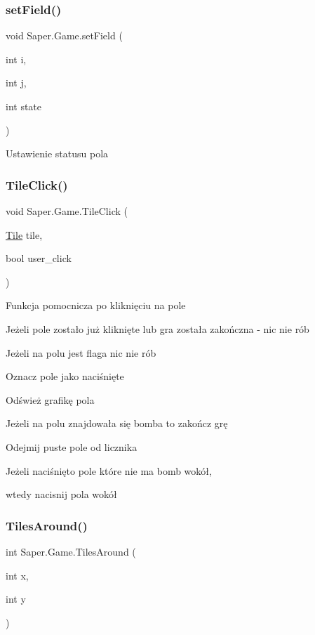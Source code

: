 \subsubsection{\texorpdfstring{setField()}{setField()}}
{\footnotesize\ttfamily void Saper.\+Game.\+set\+Field (\begin{DoxyParamCaption}\item[{int}]{i,  }\item[{int}]{j,  }\item[{int}]{state }\end{DoxyParamCaption})}

Ustawienie statusu pola \mbox{\label{class_saper_1_1_game_ad7088e52259cb63a068213bf2856eebb}} 
\subsubsection{\texorpdfstring{TileClick()}{TileClick()}}
{\footnotesize\ttfamily void Saper.\+Game.\+Tile\+Click (\begin{DoxyParamCaption}\item[{\mbox{\hyperlink{class_saper_1_1_tile}{Tile}}}]{tile,  }\item[{bool}]{user\+\_\+click }\end{DoxyParamCaption})}

Funkcja pomocnicza po kliknięciu na pole

Jeżeli pole zostało już kliknięte lub gra została zakończna -\/ nic nie rób

Jeżeli na polu jest flaga nic nie rób

Oznacz pole jako naciśnięte

Odśwież grafikę pola

Jeżeli na polu znajdowała się bomba to zakończ grę

Odejmij puste pole od licznika

Jeżeli naciśnięto pole które nie ma bomb wokół,

wtedy nacisnij pola wokół \mbox{\label{class_saper_1_1_game_a77640c9261a148c9e68f28b0b02b57c8}} 
\subsubsection{\texorpdfstring{TilesAround()}{TilesAround()}}
{\footnotesize\ttfamily int Saper.\+Game.\+Tiles\+Around (\begin{DoxyParamCaption}\item[{int}]{x,  }\item[{int}]{y }\end{DoxyParamCaption})}

